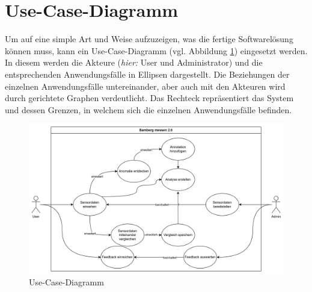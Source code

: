 \section{Use-Case-Diagramm}
Um auf eine simple Art und Weise aufzuzeigen, was die fertige Softwarelösung können muss, kann ein Use-Case-Diagramm (vgl. Abbildung \ref{fig:usecase_diagram}) eingesetzt werden. In diesem werden die Akteure (\textit{hier:} User und Administrator) und die entsprechenden Anwendungsfälle in Ellipsen dargestellt. Die Beziehungen der einzelnen Anwendungsfälle untereinander, aber auch mit den Akteuren wird durch gerichtete Graphen verdeutlicht. Das Rechteck repräsentiert das System und dessen Grenzen, in welchem sich die einzelnen Anwendungsfälle befinden. 

\begin{figure}[t]
    \centering
    \includegraphics[width=1.5\textwidth]{figures/usecases.png}
    \decoRule
    \caption[Use-Case-Diagramm]{Use-Case-Diagramm}
    \label{fig:usecase_diagram}
\end{figure}